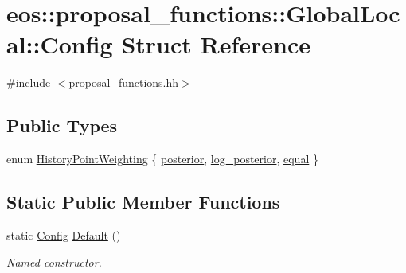 \hypertarget{structeos_1_1proposal__functions_1_1GlobalLocal_1_1Config}{
\section{eos::proposal\_\-functions::GlobalLocal::Config Struct Reference}
\label{structeos_1_1proposal__functions_1_1GlobalLocal_1_1Config}
}


{\ttfamily \#include $<$proposal\_\-functions.hh$>$}\subsection*{Public Types}
\begin{DoxyCompactItemize}
\item 
enum \hyperlink{structeos_1_1proposal__functions_1_1GlobalLocal_1_1Config_aeab1a700da2a313d2cdd5936752e34ce}{HistoryPointWeighting} \{ \hyperlink{structeos_1_1proposal__functions_1_1GlobalLocal_1_1Config_aeab1a700da2a313d2cdd5936752e34cea987cb330841992b5745daf1e94545ed8}{posterior}, 
\hyperlink{structeos_1_1proposal__functions_1_1GlobalLocal_1_1Config_aeab1a700da2a313d2cdd5936752e34cea6b25ac86fe8e91e3455e49b9da62bcab}{log\_\-posterior}, 
\hyperlink{structeos_1_1proposal__functions_1_1GlobalLocal_1_1Config_aeab1a700da2a313d2cdd5936752e34cea0ad0c6606345c9fc44bb5fe292b44c60}{equal}
 \}
\end{DoxyCompactItemize}
\subsection*{Static Public Member Functions}
\begin{DoxyCompactItemize}
\item 
static \hyperlink{structeos_1_1proposal__functions_1_1GlobalLocal_1_1Config}{Config} \hyperlink{structeos_1_1proposal__functions_1_1GlobalLocal_1_1Config_ab6e85ee9aa380cdb63827bbab9e4d1c8}{Default} ()
\begin{DoxyCompactList}\small\item\em Named constructor. \item\end{DoxyCompactList}\end{DoxyCompactItemize}
